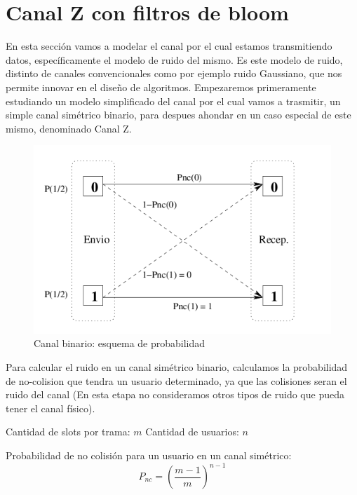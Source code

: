 \section{Canal Z con filtros de bloom}

En esta sección vamos a modelar el canal por el cual estamos transmitiendo datos, específicamente el modelo de ruido del mismo. Es este modelo de ruido, distinto de canales convencionales como por ejemplo ruido Gaussiano, que nos permite innovar en el diseño de algoritmos.
Empezaremos primeramente estudiando un modelo simplificado del canal por el cual vamos a trasmitir, un simple canal simétrico binario, para despues ahondar en un caso especial de este mismo, denominado Canal Z.
\begin{figure}[t]
  \begin{center}
    \includegraphics[scale=0.43]{capacidad/canalBinario.png}
  \end{center}
\caption {Canal binario: esquema de probabilidad}
\label{fig:canbin}
\end{figure}

Para calcular el ruido en un canal simétrico binario, calculamos la probabilidad de no-colision que tendra un usuario determinado, ya que las colisiones seran el ruido del canal (En esta etapa no consideramos otros tipos de ruido que pueda tener el canal físico).

\noindent Cantidad de slots por trama: $m$
\noindent Cantidad de usuarios: $n$

\noindent Probabilidad de no colisión para un usuario en un canal simétrico:
\begin{equation}
P_{nc}=\left(\frac{m-1}{m}\right)^{n-1}
\end{equation}


